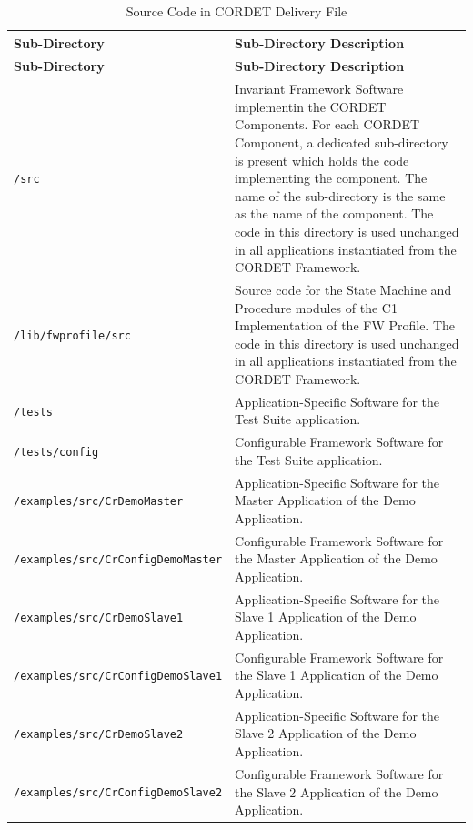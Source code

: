 \documentclass[a4paper,10pt]{article}
\begin{document}
\begin{longtable}{|l|p{7cm}|}
\caption{Source Code in CORDET Delivery File}\label{tab:srcCrDeliveryFile} \\
\hline
\rowcolor{light-gray}
\textbf{Sub-Directory} & \textbf{Sub-Directory Description}\\
\endfirsthead
\rowcolor{light-gray}
\textbf{Sub-Directory} & \textbf{Sub-Directory Description}\\
\hline\hline
\endhead

\texttt{/src} & Invariant Framework Software implementin the CORDET Components. For each CORDET Component, a dedicated sub-directory is present which holds the code implementing the component. The name of the sub-directory is the same as the name of the component. The code in this directory is used unchanged in all applications instantiated from the CORDET Framework. \\
\hline
\texttt{/lib/fwprofile/src} & Source code for the State Machine and Procedure modules of the C1 Implementation of the FW Profile. The code in this directory is used unchanged in all applications instantiated from the CORDET Framework. \\
\hline
\texttt{/tests} & Application-Specific Software for the Test Suite application. \\
\hline
\texttt{/tests/config} & Configurable Framework Software for the Test Suite application. \\
\hline
\texttt{/examples/src/CrDemoMaster} & Application-Specific Software for the Master Application of the Demo Application. \\
\hline
\texttt{/examples/src/CrConfigDemoMaster} & Configurable Framework Software for the Master Application of the Demo Application. \\
\hline
\texttt{/examples/src/CrDemoSlave1} & Application-Specific Software for the Slave 1 Application of the Demo Application. \\
\hline
\texttt{/examples/src/CrConfigDemoSlave1} & Configurable Framework Software for the Slave 1 Application of the Demo Application. \\
\hline
\texttt{/examples/src/CrDemoSlave2} & Application-Specific Software for the Slave 2 Application of the Demo Application. \\
\hline
\texttt{/examples/src/CrConfigDemoSlave2} & Configurable Framework Software for the Slave 2 Application of the Demo Application. \\
\hline
\end{longtable}
\end{document}
